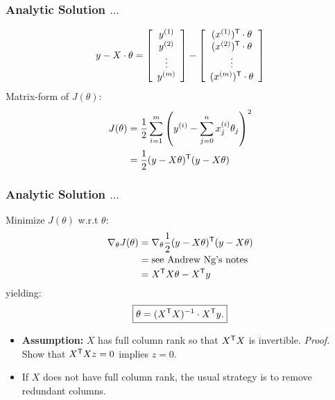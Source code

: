 \documentclass[xcolor=table]{beamer}
\newcommand{\trans}[1]{\ensuremath{#1}^{\scriptsize{\textsf{T}}}}
\begin{document}
\begin{frame}[t]
\frametitle{Analytic Solution $\ldots$}
\[y - X \cdot \theta =  \left [ \begin{array}{c} 
                                    y^{(1)} \\
                                    y^{(2)} \\
                                    \vdots \\
                                    y^{(m)}
                                \end{array}\right ] -
                        \left [ \begin{array}{c}
                                    \trans{(x^{(1)})} \cdot \theta \\
                                    \trans{(x^{(2)})} \cdot \theta \\
                                    \vdots                         \\
                                    \trans{(x^{(m)})} \cdot \theta \\
                                \end{array}
                       \right ]\]
Matrix-form of $J(\theta)$:
\begin{equation*}
\begin{split}
    J(\theta) & = \frac{1}{2} \sum_{i = 1}^{m} \left (y^{(i)} - \sum_{j = 0}^{n} 
                    x^{(i)}_j \theta_j \right )^2 \\
              & = \frac{1}{2} \trans{(y - X \theta)} (y - X \theta)
\end{split}
\end{equation*}
\end{frame}

\begin{frame}[t]
\frametitle{Analytic Solution $\ldots$}
Minimize $J(\theta)$ w.r.t $\theta$:
\begin{equation*}
\begin{split}
    \nabla_{\theta} J(\theta) & = \nabla_{\theta} \frac{1}{2} \trans{(y - X \theta)} (y - X \theta) \\
                              & = \text{see Andrew Ng's notes} \\
                              & = \trans{X} X \theta - \trans{X} y  
\end{split}
\end{equation*}
yielding: 
\[\boxed{\theta = (\trans{X} X)^{-1} \cdot \trans{X}y.}\] 

\pause

\begin{itemize}
    \item \textbf{Assumption:} $X$ has full column rank so that $\trans{X}X$ is invertible. \pause
    \emph{Proof.} Show that $\trans{X} X z = 0$ implies $z = 0$. 

    \pause

    \item If $X$ does not have full column rank, the usual strategy is to remove redundant columns.   
\end{itemize}
\end{frame}
\end{document}
